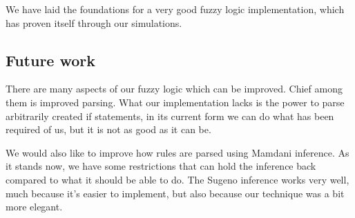 We have laid the foundations for a very good fuzzy logic
implementation, which has proven itself through our simulations.

\subsection{Future work}\label{future work}
There are many aspects of our fuzzy logic which can be improved. Chief among
them is improved parsing. What our implementation lacks is the power to
parse arbitrarily created if statements, in its current form we can do what
has been required of us, but it is not as good as it can be.

We would also like to improve how rules are parsed using Mamdani inference. As
it stands now, we have some restrictions that can hold the inference back compared
to what it should be able to do. The Sugeno inference works very well, much because
it's easier to implement, but also because our technique was a bit more elegant.
